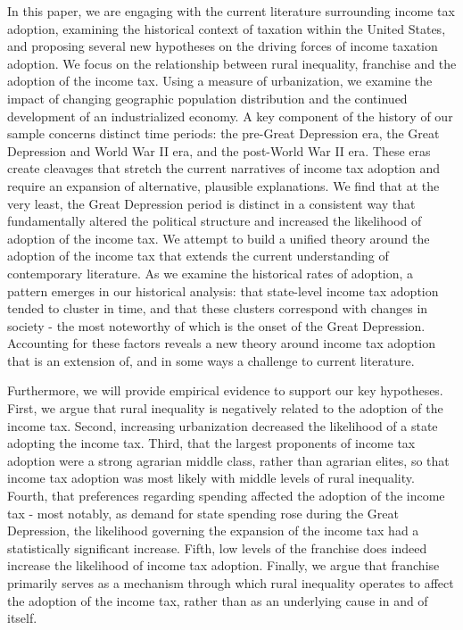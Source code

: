 \documentclass[letter, 12pt]{article}
\begin{document}
In this paper, we are engaging with the current literature surrounding income tax adoption, examining the historical context of taxation within the United States, and proposing several new hypotheses on the driving forces of income taxation adoption. We focus on the relationship between rural inequality, franchise and the adoption of the income tax. Using a measure of urbanization, we examine the impact of changing geographic population distribution and the continued development of an industrialized economy. A key component of the history of our sample concerns distinct time periods: the pre-Great Depression era, the Great Depression and World War II era, and the post-World War II era. These eras create cleavages that stretch the current narratives of income tax adoption and require an expansion of alternative, plausible explanations. We find that at the very least, the Great Depression period is distinct in a consistent way that fundamentally altered the political structure and increased the likelihood of adoption of the income tax. We attempt to build a unified theory around the adoption of the income tax that extends the current understanding of contemporary literature. As we examine the historical rates of adoption, a pattern emerges in our historical analysis: that state-level income tax adoption tended to cluster in time, and that these clusters correspond with changes in society - the most noteworthy of which is the onset of the Great Depression. Accounting for these factors reveals a new theory around income tax adoption that is an extension of, and in some ways a challenge to current literature. 

Furthermore, we will provide empirical evidence to support our key hypotheses. First, we argue that rural inequality is negatively related to the adoption of the income tax. Second, increasing urbanization decreased the likelihood of a state adopting the income tax. Third, that the largest proponents of income tax adoption were a strong agrarian middle class, rather than agrarian elites, so that income tax adoption was most likely with middle levels of rural inequality. Fourth, that preferences regarding spending affected the adoption of the income tax - most notably, as demand for state spending rose during the Great Depression, the likelihood governing the expansion of the income tax had a statistically significant increase. Fifth, low levels of the franchise does indeed increase the likelihood of income tax adoption. Finally, we argue that franchise primarily serves as a mechanism through which rural inequality operates to affect the adoption of the income tax, rather than as an underlying cause in and of itself.
\end{document}
